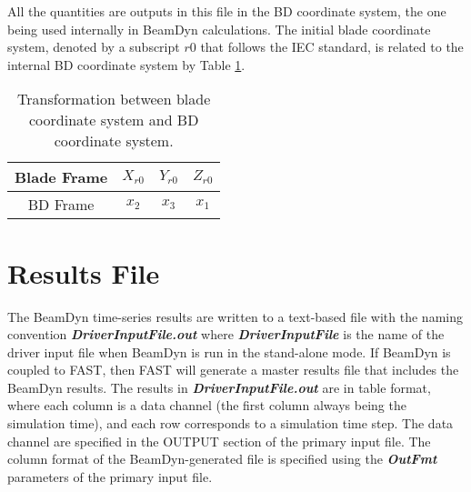 All the quantities are outputs in this file in the BD coordinate system, the one being used internally in BeamDyn calculations. The initial blade coordinate system, denoted by a subscript $r0$ that follows the IEC standard, is related to the internal BD coordinate system by Table \ref{tab:IECBD}. 
\begin{table}
\centering
\caption{Transformation between blade coordinate system and BD coordinate system.}
 \label{tab:IECBD}
 \begin{tabular}{| c | c | c | c |}
     \hline
    Blade Frame & $X_{r0}$ & $Y_{r0}$ & $Z_{r0}$ \\ \hline
    BD Frame     & $x_2$ & $x_3$ & $x_1$ \\
    \hline
\end{tabular}
\end{table}

\section{Results File}

The BeamDyn time-series results are written to a text-based file with the naming convention 
\textbf{\textit{DriverInputFile.out} } where \textbf{\textit{DriverInputFile} } is the name of the driver input file when BeamDyn is run in the stand-alone mode. If BeamDyn is coupled to FAST, then FAST will generate a master results file that includes the BeamDyn results. The results in \textbf{\textit{DriverInputFile.out} } are in table format, where each column is a data channel (the first column always being the simulation time), and each row corresponds to a simulation time step. The data channel are specified in the OUTPUT section of the primary input file. The column format of the BeamDyn-generated file is specified using the  \textbf{\textit{OutFmt}} parameters of the primary input file. 















